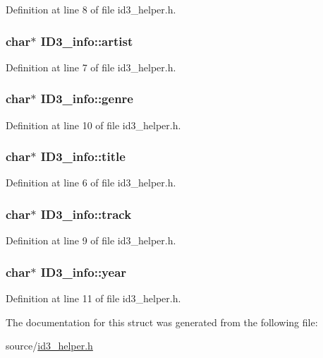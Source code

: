 Definition at line 8 of file id3\-\_\-helper.\-h.

\hypertarget{structID3__info_a2436410e971cad163dd2b21b6854f7db}{
\subsubsection[{artist}]{\setlength{\rightskip}{0pt plus 5cm}char$\ast$ I\-D3\-\_\-info\-::artist}}\label{structID3__info_a2436410e971cad163dd2b21b6854f7db}


Definition at line 7 of file id3\-\_\-helper.\-h.

\hypertarget{structID3__info_a526e7609a22a4648bd26b47125b45a91}{
\subsubsection[{genre}]{\setlength{\rightskip}{0pt plus 5cm}char$\ast$ I\-D3\-\_\-info\-::genre}}\label{structID3__info_a526e7609a22a4648bd26b47125b45a91}


Definition at line 10 of file id3\-\_\-helper.\-h.

\hypertarget{structID3__info_a29629369a9d66ed46a6b89d57d6eb87b}{
\subsubsection[{title}]{\setlength{\rightskip}{0pt plus 5cm}char$\ast$ I\-D3\-\_\-info\-::title}}\label{structID3__info_a29629369a9d66ed46a6b89d57d6eb87b}


Definition at line 6 of file id3\-\_\-helper.\-h.

\hypertarget{structID3__info_a7cb186120387859b4ea37b7c6f4498c8}{
\subsubsection[{track}]{\setlength{\rightskip}{0pt plus 5cm}char$\ast$ I\-D3\-\_\-info\-::track}}\label{structID3__info_a7cb186120387859b4ea37b7c6f4498c8}


Definition at line 9 of file id3\-\_\-helper.\-h.

\hypertarget{structID3__info_a825ffa413987b719f9dfa06fc8e9cc23}{
\subsubsection[{year}]{\setlength{\rightskip}{0pt plus 5cm}char$\ast$ I\-D3\-\_\-info\-::year}}\label{structID3__info_a825ffa413987b719f9dfa06fc8e9cc23}


Definition at line 11 of file id3\-\_\-helper.\-h.



The documentation for this struct was generated from the following file\-:\begin{DoxyCompactItemize}
\item 
source/\hyperlink{id3__helper_8h}{id3\-\_\-helper.\-h}\end{DoxyCompactItemize}
